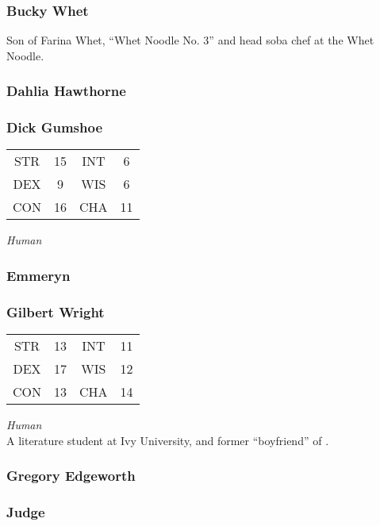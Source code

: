 \subsubsection{Bucky Whet}
\label{people:bucky}
Son of Farina Whet, ``Whet Noodle No. 3'' and head soba chef at the Whet Noodle. 


\subsubsection{Dahlia Hawthorne}
\label{people:dahlia}

\subsubsection{Dick Gumshoe}
\label{people:gumshoe}
\begin{center}
\begin{tabular}{c c|c c}
STR & 15 & INT & 6\\
DEX & 9 & WIS & 6 \\
CON & 16 & CHA & 11 \end{tabular}\end{center}
\textit{Human}\\

\subsubsection{Emmeryn}
\label{people:emmeryn}

\subsubsection{Gilbert Wright}
\label{people:phoenix}
\begin{center}
\begin{tabular}{c c|c c}
STR & 13 & INT & 11\\
DEX & 17 & WIS & 12 \\
CON & 13 & CHA & 14 \end{tabular}\end{center}
\textit{Human}\\
A literature student at Ivy University, and former ``boyfriend'' of . 

\subsubsection{Gregory Edgeworth}
\label{people:gregory}

\subsubsection{Judge}
\label{people:judge}


